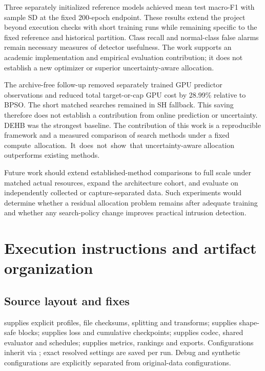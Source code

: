 \documentclass[11pt,a4paper]{report}
\begin{document}
Three separately initialized reference models achieved mean test macro-F1 \FinalTestFOne{} with sample SD \FinalTestFOneSD{} at the fixed 200-epoch endpoint. These results extend the project beyond execution checks with short training runs while remaining specific to the fixed reference and historical partition. Class recall and normal-class false alarms remain necessary measures of detector usefulness. The work supports an academic implementation and empirical evaluation contribution; it does not establish a new optimizer or superior uncertainty-aware allocation.

The archive-free follow-up removed separately trained GPU predictor observations and reduced total target-or-cap GPU cost by 28.99\% relative to BPSO. The short matched searches remained in SH fallback. This saving therefore does not establish a contribution from online prediction or uncertainty. DEHB was the strongest baseline. The contribution of this work is a reproducible framework and a measured comparison of search methods under a fixed \mbox{compute allocation. It does not show that} uncertainty-aware allocation outperforms existing methods.




Future work should extend established-method comparisons to full scale under matched actual resources, expand the architecture cohort, and evaluate on independently collected or capture-separated data. Such experiments would determine whether a residual allocation problem remains after adequate training and whether any search-policy change improves practical intrusion detection.

\appendix
\chapter{Execution instructions and artifact organization}
\section{Source layout and fixes}
 supplies explicit profiles, file checksums, splitting and transforms;  supplies shape-safe blocks;  supplies loss and cumulative checkpoints;  supplies codec, shared evaluator and schedules;  supplies metrics, rankings and exports. Configurations inherit via ; exact resolved settings are saved per run. Debug and synthetic configurations are explicitly separated from original-data configurations.
\end{document}
